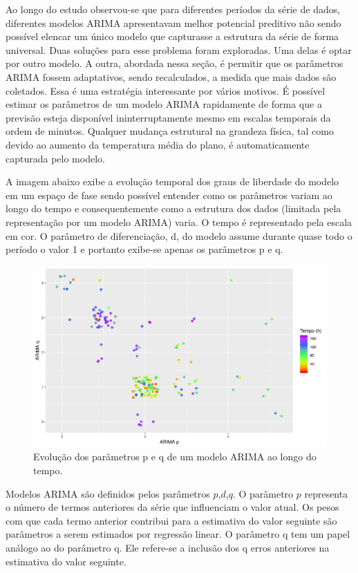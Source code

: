 \documentclass[
	12pt,				%
	openright,			%
	oneside,			%
	a4paper,			%
	english,			%
	french,				%
	spanish,			%
	brazil				%
	]{abntex2}
\begin{document}
Ao longo do estudo observou-se que para diferentes períodos da série de dados, diferentes modelos ARIMA apresentavam melhor potencial preditivo não sendo possível elencar um único modelo que capturasse a estrutura da série de forma universal. Duas soluções para esse problema foram exploradas. Uma delas é optar por outro modelo. A outra, abordada nessa seção, é permitir que os parâmetros ARIMA fossem adaptativos, sendo recalculados, a medida que mais dados são coletados.
Essa é uma estratégia interessante por vários motivos. É possível estimar os parâmetros de um modelo ARIMA rapidamente de forma que a previsão esteja disponível ininterruptamente mesmo em escalas temporais da ordem de minutos. Qualquer mudança estrutural na grandeza física, tal como devido ao aumento da temperatura média do plano, é automaticamente capturada pelo modelo.

A imagem abaixo exibe a evolução temporal dos graus de liberdade do modelo em um espaço de fase sendo possível entender como os parâmetros variam ao longo do tempo e consequentemente como a estrutura dos dados (limitada pela representação por um modelo ARIMA) varia. O tempo é representado pela escala em cor. O parâmetro de diferenciação, d, do modelo assume durante quase todo o período o valor 1 e portanto exibe-se apenas os parâmetros p e q.

\begin{figure}[h]
    \centering
	\includegraphics[width=\textwidth]{var_arima}
	\caption{Evolução dos parâmetros p e q de um modelo ARIMA ao longo do tempo.}
\end{figure}
\FloatBarrier

Modelos ARIMA são definidos pelos parâmetros $p$,$d$,$q$. O parâmetro $p$ representa o número de termos anteriores da série que influenciam o valor atual. Os pesos com que cada termo anterior contribui para a estimativa do valor seguinte são parâmetros a serem estimados por regressão linear.
O parâmetro q tem um papel análogo ao do parâmetro q. Ele refere-se a inclusão dos q erros anteriores na estimativa do valor seguinte.
\end{document}
